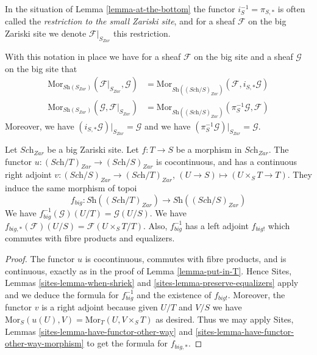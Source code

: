 \begin{definition}
\label{definition-restriction-small-zariski}
In the situation of
Lemma \ref{lemma-at-the-bottom}
the functor $i_S^{-1} = \pi_{S, *}$ is often
called the {\it restriction to the small Zariski site}, and for a sheaf
$\mathcal{F}$ on the big Zariski site we denote $\mathcal{F}|_{S_{Zar}}$
this restriction.
\end{definition}

\noindent
With this notation in place we have for a sheaf $\mathcal{F}$ on the
big site and a sheaf $\mathcal{G}$ on the big site that
\begin{align*}
\text{Mor}_{\textit{Sh}(S_{Zar})}(\mathcal{F}|_{S_{Zar}}, \mathcal{G})
& =
\text{Mor}_{\textit{Sh}((\textit{Sch}/S)_{Zar})}(\mathcal{F},
i_{S,*}\mathcal{G}) \\
\text{Mor}_{\textit{Sh}(S_{Zar})}(\mathcal{G}, \mathcal{F}|_{S_{Zar}})
& =
\text{Mor}_{\textit{Sh}((\textit{Sch}/S)_{Zar})}(\pi_S^{-1}\mathcal{G},
\mathcal{F})
\end{align*}
Moreover, we have $(i_{S,*}\mathcal{G})|_{S_{Zar}} = \mathcal{G}$
and we have $(\pi_S^{-1}\mathcal{G})|_{S_{Zar}} = \mathcal{G}$.

\begin{lemma}
\label{lemma-morphism-big}
Let $\textit{Sch}_{Zar}$ be a big Zariski site.
Let $f : T \to S$ be a morphism in $\textit{Sch}_{Zar}$.
The functor $u : (\textit{Sch}/T)_{Zar} \to (\textit{Sch}/S)_{Zar}$
is cocontinuous, and has a continuous right adjoint
$v : (\textit{Sch}/S)_{Zar} \to (\textit{Sch}/T)_{Zar}$,
$(U \to S) \mapsto (U \times_S T \to T)$. They induce the same morphism
of topoi
$$
f_{big} :
\textit{Sh}((\textit{Sch}/T)_{Zar})
\longrightarrow
\textit{Sh}((\textit{Sch}/S)_{Zar})
$$
We have $f_{big}^{-1}(\mathcal{G})(U/T) = \mathcal{G}(U/S)$.
We have $f_{big, *}(\mathcal{F})(U/S) = \mathcal{F}(U\times_ST/T)$.
Also, $f_{big}^{-1}$ has a left adjoint $f_{big!}$ which commutes with
fibre products and equalizers.
\end{lemma}

\begin{proof}
The functor $u$ is cocontinuous, commutes with fibre products,
and is continuous, exactly as in the proof of Lemma \ref{lemma-put-in-T}.
Hence Sites, Lemmas \ref{sites-lemma-when-shriek}
and \ref{sites-lemma-preserve-equalizers}
apply and we deduce the formula
for $f_{big}^{-1}$ and the existence of $f_{big!}$. Moreover,
the functor $v$ is a right adjoint because given $U/T$ and $V/S$
we have $\text{Mor}_S(u(U), V) = \text{Mor}_T(U, V\times_S T)$
as desired. Thus we may apply
Sites, Lemmas \ref{sites-lemma-have-functor-other-way} and
\ref{sites-lemma-have-functor-other-way-morphism} to get the
formula for $f_{big, *}$.
\end{proof}


